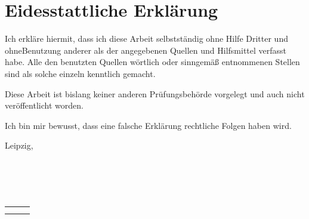 \newpage
\chapter*{Eidesstattliche Erklärung}

Ich erkläre hiermit, dass ich diese Arbeit selbstständig ohne Hilfe Dritter und ohne\linebreak Benutzung anderer als der angegebenen
Quellen und Hilfsmittel verfasst habe. Alle den benutzten Quellen wörtlich oder sinngemäß entnommenen Stellen
sind als solche einzeln kenntlich gemacht.

\noindent
Diese Arbeit ist bislang keiner anderen Prüfungsbehörde vorgelegt und auch nicht \linebreak veröffentlicht worden.

\noindent
Ich bin mir bewusst, dass eine falsche Erklärung rechtliche Folgen haben wird.

\noindent
Leipzig, \space \datum\\
\\
\\
\\
\\
\vspace{1,5 cm} 
\begin{tabular}{p{6cm}p{0.5cm}l}
	\dotfill \\ 
	\vorname \space \name
\end{tabular}